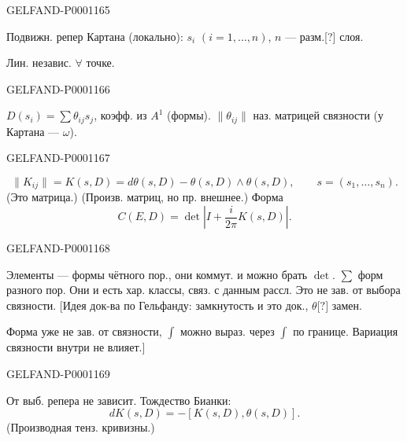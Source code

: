 \begin{GelfandAdjacentEvidence}{GELFAND-P000116}{5}

Подвижн. репер Картана (локально): $s_i$ $(i=1,\ldots,n)$,
$n$ — разм.[?] слоя.

Лин. независ. $\forall$ точке.
\end{GelfandAdjacentEvidence}
\begin{GelfandAdjacentEvidence}{GELFAND-P000116}{6}


$D(s_i)=\sum\theta_{ij}s_j$, коэфф. из $A^1$ (формы).
$\|\theta_{ij}\|$ наз. матрицей связности (у Картана — $\omega$).
\end{GelfandAdjacentEvidence}
\begin{GelfandAdjacentEvidence}{GELFAND-P000116}{7}

\begin{equation*}
\|K_{ij}\|=K(s,D)=d\theta(s,D)-\theta(s,D)\wedge\theta(s,D),
\qquad s=(s_1,\ldots,s_n).
\end{equation*}
(Это матрица.) (Произв. матриц, но пр. внешнее.)
Форма
\begin{equation*}C(E,D)=\det\left|I+\frac{i}{2\pi}K(s,D)\right|.\end{equation*}
\end{GelfandAdjacentEvidence}
\begin{GelfandAdjacentEvidence}{GELFAND-P000116}{8}

Элементы — формы чётного пор., они коммут. и можно брать $\det$.
$\sum$ форм разного пор. Они и есть хар. классы,
связ. с данным рассл. Это не зав. от выбора связности.
[Идея док-ва по Гельфанду: замкнутость и это док., $\theta\text{[?]}$ замен.

Форма уже не зав. от связности, $\int$ можно выраз. через
$\int$ по границе. Вариация связности внутри не влияет.]
\end{GelfandAdjacentEvidence}
\begin{GelfandAdjacentEvidence}{GELFAND-P000116}{9}


От выб. репера не зависит.
Тождество Бианки:
\begin{equation*}dK(s,D)=-[K(s,D),\theta(s,D)].\end{equation*}
(Производная тенз. кривизны.)
\end{GelfandAdjacentEvidence}
